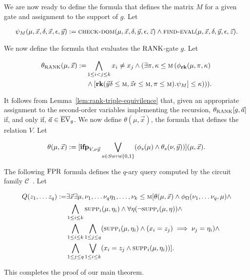\documentclass[../main/thesis.tex]{subfiles}
\begin{document}
We are now ready to define the formula that defines the matrix $M$ for a given
gate and assignment to the support of $g$. Let
				
\begin{align*}
	\psi_M (\mu, \vec{x}, \delta, \vec{x}, \epsilon, \vec{y}) :=  \textsc{check-dom}(\mu, \vec{x}, \delta, \vec{y}, \epsilon, \vec{z}) \land \textsc{find-eval} (\mu, \vec{x}, \delta, \vec{y}, \epsilon, \vec{z}).
\end{align*}
				
We now define the formula that evaluates the $\text{\upshape RANK}$-gate $g$. Let
				
\begin{align*}
	\theta_\text{\upshape RANK} (\mu, \vec{x}) := & \bigwedge_{1 \leq i < j \leq k} x_i \neq x_j \land (\exists \pi, \kappa \leq \textsc{m} \, (\phi_{\text{\textbf{rk}}}(\mu, \pi, \kappa) \\ &\land [\text{\textbf{rk}} (\vec{y}\delta\leq \textsc{m}, \vec{z}\epsilon\leq \textsc{m}, \pi \leq \textsc{m}). \psi_M] \leq \kappa ))).
\end{align*}

It follows from Lemma~\ref{lem:rank-triple-equivilence} that, given an
appropriate assignment to the second-order variables implementing the recursion,
$\theta_{\text{\upshape RANK}}[g, \vec{a}]$ if, and only if, $\vec{a} \in \overline{\text{EV}}_g$. We
now define $\theta(\mu, \vec{x})$, the formula that defines the relation $V$.
Let

\begin{align*}
	\theta (\mu, \vec{x}) := [\text{\textbf{ifp}}_{V,\nu \vec{y}} \bigvee_{s \in  S \uplus \tau \uplus \{0,1\}} (\phi_s(\mu) \land \theta_s (\nu, \vec{y} ))] (\mu, \vec{x}).
\end{align*}

The following $\text{\upshape FPR}$ formula defines the $q$-ary query computed by the circuit
family $\mathcal{C}$~\cite{AndersonD17}. Let
				
\begin{align*}
	Q (z_1, \ldots z_q) := & \exists \vec{x} \exists \mu, \nu_1 , \ldots  \nu_q \eta_1 , \ldots , \nu_k \leq \textsc{m} [\theta (\mu, \vec{x}) \land \phi_\Omega (\nu_1, \ldots \nu_q, \mu) \land \\
                         & \bigwedge_{1 \leq i \leq k} \textsc{supp}_i (\mu, \eta_i) \wedge \forall \eta (\neg \textsc{supp}_i (\mu, \eta)) \land \\
                         & \bigwedge_{1 \leq i \leq k} \bigwedge_{1 \leq j \leq q}(\textsc{supp}_i (\mu, \eta_i) \land (x_i = z_j) \implies \nu_j = \eta_i) \land \\ &                                                                                                                                                        \bigwedge_{1 \leq j \leq q} \bigvee_{1 \leq i \leq k} (x_i = z_j \land \textsc{supp}_i (\mu, \eta_i))].
\end{align*}
				
This completes the proof of our main theorem.
\end{document}
